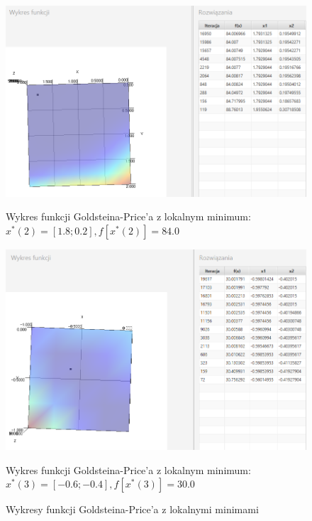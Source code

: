 \documentclass[10pt, a4paper]{article}
\begin{document}
\begin{figure}[htbp] 
	\begin{minipage}[b]{1\textwidth}
		\centering
		\includegraphics[width=\linewidth]{images/goldprice2.PNG}
		\caption{Wykres funkcji Goldsteina-Price’a z lokalnym minimum: $x^*(2)=[1.8; 0.2], f[x^*(2)]=84.0$ }
	\end{minipage} 
	\begin{minipage}[b]{1\textwidth}
		\centering
		\includegraphics[width=\linewidth]{images/goldprice3.PNG}
		\caption{Wykres funkcji Goldsteina-Price’a z lokalnym minimum: $x^*(3)=[-0.6; -0.4], f[x^*(3)] = 30.0$ }
	\end{minipage}
	\label{fig:102}
	\caption{Wykresy funkcji Goldsteina-Price’a z lokalnymi minimami }
\end{figure}
\end{document}
